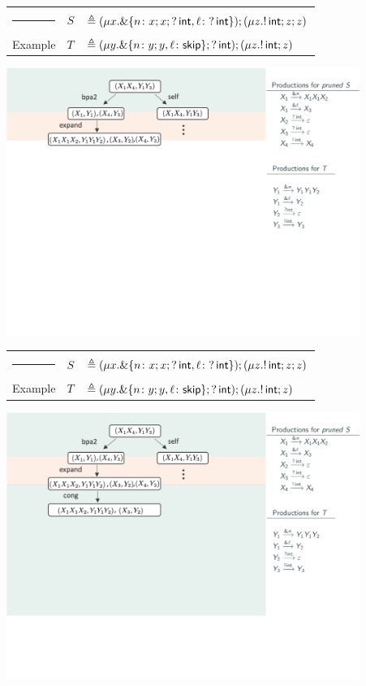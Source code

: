 \documentclass[10pt]{beamer}
\begin{document}
\begin{frame}
	\begin{tabular} {l l l }
  		{\color{teal}\rule{3cm}{2pt}} &  $S$ &$\triangleq (\mu x. \&\{n\colon x;x;?\,\mathsf{int},
      \ell\colon ?\,\mathsf{int} \});( \mu z. !\,\mathsf{int}; z;z )$\\
  		{\color{teal} Example}  &  $T$ &$\triangleq (\mu y. \&\{n\colon y;y,
      \ell\colon \mathsf{skip} \}; ?\,\mathsf{int}); (\mu z. !\,\mathsf{int}; z)$
	\end{tabular}
	\vspace*{2mm}
	\includegraphics[width=11.5cm]{img/exemplo-7}\smallskip
\end{frame}

\begin{frame}
	\begin{tabular} {l l l }
  		{\color{teal}\rule{3cm}{2pt}} &  $S$ &$\triangleq (\mu x. \&\{n\colon x;x;?\,\mathsf{int},
      \ell\colon ?\,\mathsf{int} \});( \mu z. !\,\mathsf{int}; z;z )$\\
 		{\color{teal} Example}  &  $T$ &$\triangleq (\mu y. \&\{n\colon y;y,
      \ell\colon \mathsf{skip} \}; ?\,\mathsf{int}); (\mu z. !\,\mathsf{int}; z)$
	\end{tabular}
	\vspace*{2mm}
	\includegraphics[width=11.5cm]{img/exemplo-6}\smallskip
\end{frame}
\end{document}

